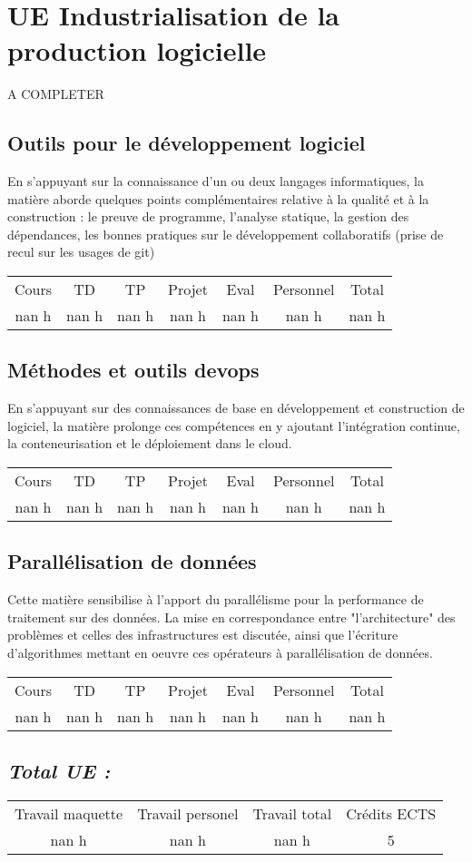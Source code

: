 \section{UE Industrialisation de la production logicielle}%
\label{sec:UEIndustrialisationdelaproductionlogicielle}%
A COMPLETER%
\subsection{Outils pour le développement logiciel }%
\label{subsec:Outilspourledveloppementlogiciel}%

%
En s'appuyant sur la connaissance d'un ou deux langages informatiques, la matière aborde quelques points complémentaires relative à la qualité et à la construction : le preuve de programme, l'analyse statique, la gestion des dépendances, les bonnes pratiques sur le développement collaboratifs (prise de recul sur les usages de git)%
\begin{longtable}{c c c c c c c}%
\hline%
Cours&TD&TP&Projet&Eval&Personnel&Total\\%
nan h&nan h&nan h&nan h&nan h&nan h&nan h\\%
\hline%
\end{longtable}%
\subsection{Méthodes et outils devops}%
\label{subsec:Mthodesetoutilsdevops}%

%
En s'appuyant sur des connaissances de base en développement et construction de logiciel, la matière prolonge ces compétences en y ajoutant l'intégration continue, la conteneurisation et le déploiement dans le cloud.%
\begin{longtable}{c c c c c c c}%
\hline%
Cours&TD&TP&Projet&Eval&Personnel&Total\\%
nan h&nan h&nan h&nan h&nan h&nan h&nan h\\%
\hline%
\end{longtable}%
\subsection{Parallélisation de données}%
\label{subsec:Paralllisationdedonnes}%

%
Cette matière sensibilise à l'apport du parallélisme pour la performance de traitement sur des données. La mise en correspondance entre "l'architecture" des problèmes et celles des infrastructures est discutée, ainsi que l'écriture d'algorithmes mettant en oeuvre ces opérateurs à parallélisation de données. %
\begin{longtable}{c c c c c c c}%
\hline%
Cours&TD&TP&Projet&Eval&Personnel&Total\\%
nan h&nan h&nan h&nan h&nan h&nan h&nan h\\%
\hline%
\end{longtable}%
\subsection{\textit{Total UE :}}%
\label{subsec:textitTotalUE}%

%
\begin{longtable}{c c c c}%
\hline%
Travail maquette&Travail personel&Travail total&Crédits ECTS\\%
nan h&nan h&nan h&5\\%
\hline%
\end{longtable}